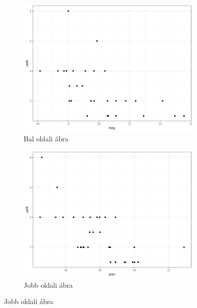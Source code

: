 \documentclass[
]{article}
\begin{document}
\begin{figure}[h]
\begin{multicols}{2}
\begin{figure}[H]
\includegraphics[width = \linewidth]{cookbook_files/figure-latex/carb-fig1-1}
\caption{Bal oldali ábra}
\label{fig:bar2_a6}
\end{figure}

\columnbreak

\begin{figure}[H]
\includegraphics[width = \linewidth]{cookbook_files/figure-latex/carb-fig1-2}
\centering
\caption{Jobb oldali ábra}
\label{fig:bar2_b6}
\end{figure}
\end{multicols}
\end{figure}
\end{document}
